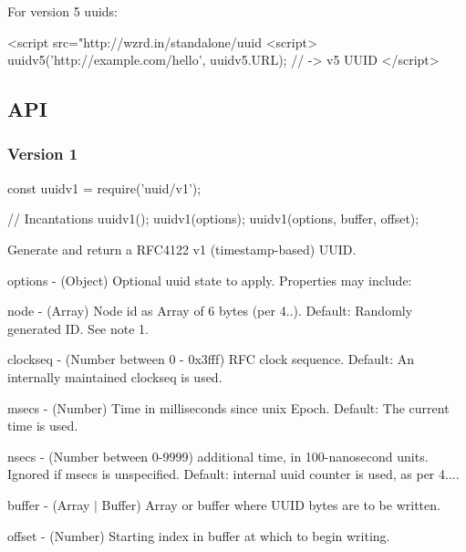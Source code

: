 For version 5 uuids\+:


\begin{DoxyCode}
<script src="http://wzrd.in/standalone/uuid%
<script>
uuidv5('http://example.com/hello', uuidv5.URL); // -> v5 UUID
</script>
\end{DoxyCode}


\subsection*{A\+PI}

\subsubsection*{Version 1}


\begin{DoxyCode}
const uuidv1 = require('uuid/v1');

// Incantations
uuidv1();
uuidv1(options);
uuidv1(options, buffer, offset);
\end{DoxyCode}


Generate and return a R\+F\+C4122 v1 (timestamp-\/based) U\+U\+ID.


\begin{DoxyItemize}
\item {\ttfamily options} -\/ (Object) Optional uuid state to apply. Properties may include\+:
\begin{DoxyItemize}
\item {\ttfamily node} -\/ (Array) Node id as Array of 6 bytes (per 4..). Default\+: Randomly generated ID. See note 1.
\item {\ttfamily clockseq} -\/ (Number between 0 -\/ 0x3fff) R\+FC clock sequence. Default\+: An internally maintained clockseq is used.
\item {\ttfamily msecs} -\/ (Number) Time in milliseconds since unix Epoch. Default\+: The current time is used.
\item {\ttfamily nsecs} -\/ (Number between 0-\/9999) additional time, in 100-\/nanosecond units. Ignored if {\ttfamily msecs} is unspecified. Default\+: internal uuid counter is used, as per 4....
\end{DoxyItemize}
\item {\ttfamily buffer} -\/ (Array $\vert$ Buffer) Array or buffer where U\+U\+ID bytes are to be written.
\item {\ttfamily offset} -\/ (Number) Starting index in {\ttfamily buffer} at which to begin writing.
\end{DoxyItemize}

